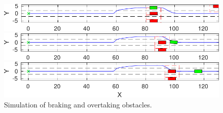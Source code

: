 \documentclass[conference, 11pt]{IEEEtran}
\begin{document}
\begin{figure}[H]
\begin{minipage}[t]{\columnwidth}
		\includegraphics[width=1\columnwidth]{../../MATLAB/three_obstacles_no_overtaking/figure/braking_4.pdf}
	\end{minipage}
	\begin{minipage}[t]{\columnwidth}
		\includegraphics[width=1\columnwidth]{../../MATLAB/three_obstacles_no_overtaking/figure/braking_5.pdf}
	\end{minipage}
	\begin{minipage}[t]{\columnwidth}
		\includegraphics[width=1\columnwidth]{../../MATLAB/three_obstacles_no_overtaking/figure/braking_6.pdf}
	\end{minipage}	
	\vspace{-20pt}
	\caption{Simulation of braking and overtaking obstacles.}
	\label{fig:braking}
\end{figure}
\end{document}
